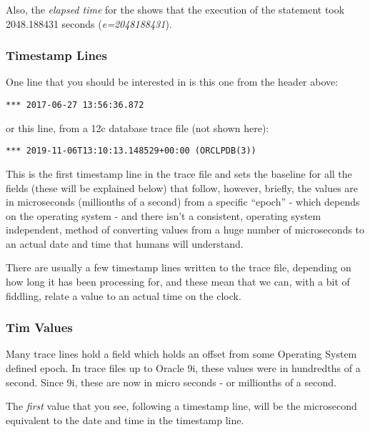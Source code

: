 Also, the \emph{elapsed time} for the  shows that the execution of the statement took 2048.188431 seconds (\emph{e=2048188431}).


\subsubsection{Timestamp Lines}\label{timestamp-lines}

One line that you should be interested in is this one from the header above:

\begin{lstlisting}[numbers=none,caption={11g Time Stamp Line}]
*** 2017-06-27 13:56:36.872
\end{lstlisting}

or this line, from a 12c database trace file (not shown here):

\begin{lstlisting}[numbers=none,caption={12c Time Stamp Line}]
*** 2019-11-06T13:10:13.148529+00:00 (ORCLPDB(3))
\end{lstlisting}


This is the first timestamp line in the trace file and sets the baseline for all the  fields (these will be explained below) that follow, however, briefly, the  values are in microseconds (millionths of a second) from a specific ``epoch'' - which depends on the operating system - and there isn't a consistent, operating system independent, method of converting  values from a huge number of microseconds to an actual date and time that humans will understand.

There are usually a few timestamp lines written to the trace file, depending on how long it has been processing for, and these mean that we can, with a bit of fiddling, relate a  value to an actual time on the clock.


\subsubsection{Tim Values}\label{tim-values}

Many trace lines hold a  field which holds an offset from some Operating System defined epoch. In trace files up to Oracle 9i, these values were in hundredths of a second. Since 9i, these are now in micro seconds - or millionths of a second.

The \emph{first}  value that you see, following a timestamp line, will be the microsecond equivalent to the date and time in the timestamp line.



